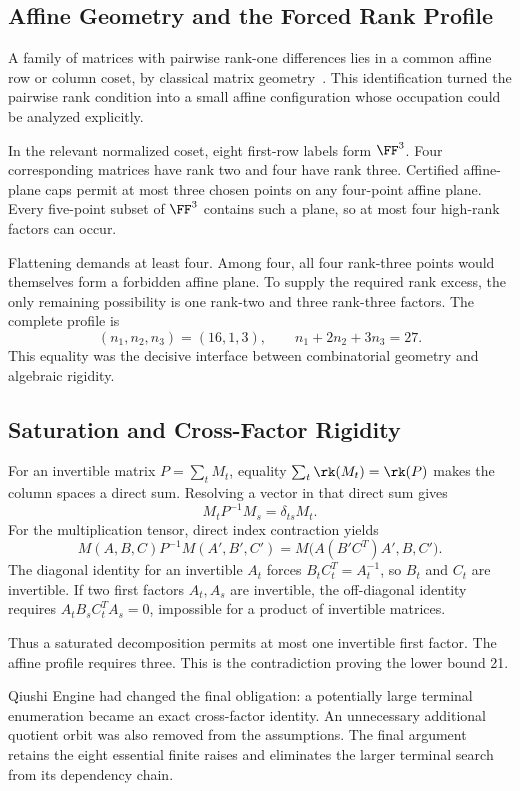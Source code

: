 \subsection{Affine Geometry and the Forced Rank Profile}\label{route:geometry}

A family of matrices with pairwise rank-one differences lies in a
common affine row or column coset, by classical matrix
geometry~\cite{hua1945geometries,wan1996geometry}. This identification
turned the pairwise rank condition into a small affine configuration
whose occupation could be analyzed explicitly.

In the relevant normalized coset, eight first-row labels form
$\FF^3$. Four corresponding matrices have rank two and four have
rank three. Certified affine-plane caps permit at most three chosen
points on any four-point affine plane. Every five-point subset of
$\FF^3$ contains such a plane, so at most four high-rank factors
can occur.

Flattening demands at least four. Among four, all four rank-three
points would themselves form a forbidden affine plane. To supply
the required rank excess, the only remaining possibility is
one rank-two and three rank-three factors. The complete profile is
\[
 (n_1,n_2,n_3)=(16,1,3),\qquad
 n_1+2n_2+3n_3=27.
\]
This equality was the decisive interface between combinatorial
geometry and algebraic rigidity.

\subsection{Saturation and Cross-Factor Rigidity}\label{route:saturation}

For an invertible matrix $P=\sum_t M_t$, equality
$\sum_t\rk(M_t)=\rk(P)$ makes the column spaces a direct sum.
Resolving a vector in that direct sum gives
\[
 M_tP^{-1}M_s=\delta_{ts}M_t.
\]
For the multiplication tensor, direct index contraction yields
\[
 M(A,B,C)P^{-1}M(A',B',C')
   =M\bigl(A(B'C^T)A',B,C'\bigr).
\]
The diagonal identity for an invertible $A_t$ forces
$B_tC_t^T=A_t^{-1}$, so $B_t$ and $C_t$ are invertible.
If two first factors $A_t,A_s$ are invertible, the off-diagonal
identity requires $A_tB_sC_t^TA_s=0$, impossible for a product
of invertible matrices.

Thus a saturated decomposition permits at most one invertible
first factor. The affine profile requires three. This is the
contradiction proving the lower bound 21.

Qiushi Engine had changed the final obligation: a potentially large
terminal enumeration became an exact cross-factor identity. An unnecessary
additional quotient orbit was also removed from the assumptions.
The final argument retains the eight essential finite raises
and eliminates the larger terminal search from its dependency chain.

